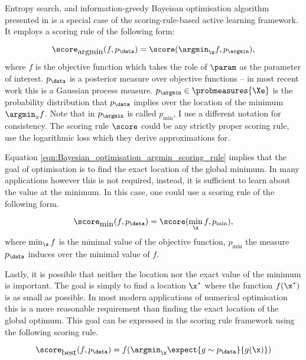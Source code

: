Entropy search, and information-greedy Bayeisan optimisation algorithm presented in \citep{Hennig2012entropy} is a special case of the scoring-rule-based active learning framework. It employs a scoring rule of the following form:

\begin{equation}
	\score_{\mbox{argmin}}(f,p_\data) = \score(\argmin_{\x}f,p_{\argmin}), \label{eqn:Bayesian_optimisation_argmin_scoring_rule}
\end{equation}
where $f$ is the objective function which takes the role of $\param$ as the parameter of interest. $p_\data$ is a posterior measure over objective functions -- in most recent work this is a Gaussian process measure. $p_{\argmin} \in \probmeasures{\Xe}$ is the probability distribution that $p_\data$ implies over the location of the minimum $\argmin_{x}f$. Note that in \citep{Hennig2012entropy} $p_{\argmin}$ is called $p_{\min}$, I use a different notation for consistency. The scoring rule $\score$ could be any strictly proper scoring rule, \citeauthor{Hennig2012entropy} use the logarithmic loss which they derive approximations for.

Equation \eqref{eqn:Bayesian_optimisation_argmin_scoring_rule} implies that the goal of optimisation is to find the exact location of the global minimum. In many applications however this is not required, instead, it is sufficient to learn about the value at the minimum. In this case, one could use a scoring rule of the following form.

\begin{equation}
	\score_{\mbox{min}}(f,p_\data) = \score(\min_{\x}f,p_{\min}), \label{eqn:Bayesian_optimisation_min_scoring_rule}
\end{equation}
where $\min_{\x}f$ is the minimal value of the objective function, $p_{\min}$ the measure $p_\data$ induces over the minimal value of $f$.

Lastly, it is possible that neither the location nor the exact value of the minimum is important. The goal is simply to find a location $\x^{*}$ where the function $f(\x^{*})$ is as small as possible. In most modern applications of numerical optimisation this is a more reasonable requirement than finding the exact location of the global optimum. This goal can be expressed in the scoring rule framework using the following scoring rule.

\begin{equation}
	\score_{\mbox{best}}(f,p_\data) = f(\argmin_{\x}\expect{g\sim p_\data}{g(\x)}) \label{eqn:Bayesian_optimisation_scoring_rule}
\end{equation}

